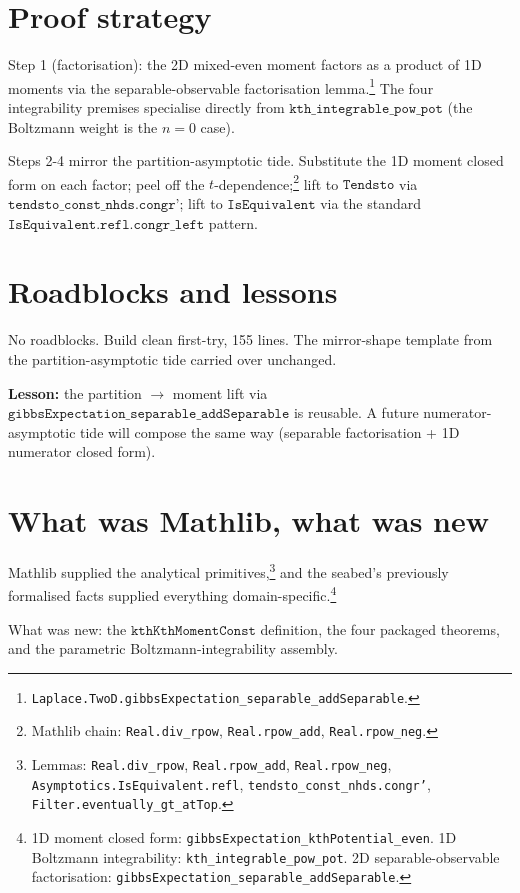 \documentclass[11pt]{article}
\begin{document}
\section{Proof strategy}

Step 1 (factorisation): the 2D mixed-even moment factors as a
product of 1D moments via the separable-observable factorisation
lemma.\footnote{\texttt{Laplace.TwoD.gibbsExpectation\_separable\_addSeparable}.}
The four integrability premises specialise directly from
$\texttt{kth\_integrable\_pow\_pot}$ (the Boltzmann weight is the
$n = 0$ case).

Steps 2-4 mirror the partition-asymptotic tide. Substitute the 1D
moment closed form on each factor; peel off the
$t$-dependence;\footnote{Mathlib chain: \texttt{Real.div\_rpow},
\texttt{Real.rpow\_add}, \texttt{Real.rpow\_neg}.} lift to
$\texttt{Tendsto}$ via $\texttt{tendsto\_const\_nhds.congr'}$; lift
to $\texttt{IsEquivalent}$ via the standard
$\texttt{IsEquivalent.refl.congr\_left}$ pattern.

\section{Roadblocks and lessons}

No roadblocks. Build clean first-try, 155 lines. The mirror-shape
template from the partition-asymptotic tide carried over
unchanged.

\textbf{Lesson:} the partition $\to$ moment lift via
$\texttt{gibbsExpectation\_separable\_addSeparable}$ is reusable.
A future numerator-asymptotic tide will compose the same way
(separable factorisation + 1D numerator closed form).

\section{What was Mathlib, what was new}

Mathlib supplied the analytical primitives,\footnote{Lemmas:
\texttt{Real.div\_rpow}, \texttt{Real.rpow\_add},
\texttt{Real.rpow\_neg}, \texttt{Asymptotics.IsEquivalent.refl},
\texttt{tendsto\_const\_nhds.congr'},
\texttt{Filter.eventually\_gt\_atTop}.} and the seabed's previously
formalised facts supplied everything domain-specific.\footnote{1D
moment closed form: \texttt{gibbsExpectation\_kthPotential\_even}.
1D Boltzmann integrability: \texttt{kth\_integrable\_pow\_pot}.
2D separable-observable factorisation:
\texttt{gibbsExpectation\_separable\_addSeparable}.}

What was new: the
$\texttt{kthKthMomentConst}$ definition, the four packaged
theorems, and the parametric Boltzmann-integrability assembly.
\end{document}

